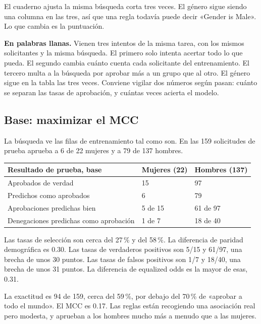 \documentclass[11pt]{article}
\newcommand{\pct}[1]{\mbox{#1\,\%}}
\begin{document}
El cuaderno ajusta la misma búsqueda corta tres veces. El género sigue siendo una columna en las tres, así que una regla todavía puede decir «Gender is Male». Lo que cambia es la puntuación.

\begin{plainwords}
\textbf{En palabras llanas.} Vienen tres intentos de la misma tarea, con los mismos solicitantes y la misma búsqueda. El primero solo intenta acertar todo lo que pueda. El segundo cambia cuánto cuenta cada solicitante del entrenamiento. El tercero multa a la búsqueda por aprobar más a un grupo que al otro. El género sigue en la tabla las tres veces. Conviene vigilar dos números según pasan: cuánto se separan las tasas de aprobación, y cuántas veces acierta el modelo.
\end{plainwords}

\subsection{Base: maximizar el MCC}

La búsqueda ve las filas de entrenamiento tal como son. En las 159 solicitudes de prueba aprueba a 6 de 22 mujeres y a 79 de 137 hombres.

\begin{table}[H]
\centering
\small
\begin{tabularx}{\textwidth}{@{}l Y Y@{}}
\toprule
Resultado de prueba, base & Mujeres (22) & Hombres (137) \\
\midrule
Aprobados de verdad & 15 & 97 \\
Predichos como aprobados & 6 & 79 \\
Aprobaciones predichas bien & 5 de 15 & 61 de 97 \\
Denegaciones predichas como aprobación & 1 de 7 & 18 de 40 \\
\bottomrule
\end{tabularx}
\end{table}

Las tasas de selección son cerca del \pct{27} y del \pct{58}. La diferencia de paridad demográfica es 0.30. Las tasas de verdaderos positivos son 5/15 y 61/97, una brecha de unos 30 puntos. Las tasas de falsos positivos son 1/7 y 18/40, una brecha de unos 31 puntos. La diferencia de equalized odds es la mayor de esas, 0.31.

La exactitud es 94 de 159, cerca del \pct{59}, por debajo del \pct{70} de «aprobar a todo el mundo». El MCC es 0.17. Las reglas están recogiendo una asociación real pero modesta, y aprueban a los hombres mucho más a menudo que a las mujeres.
\end{document}
